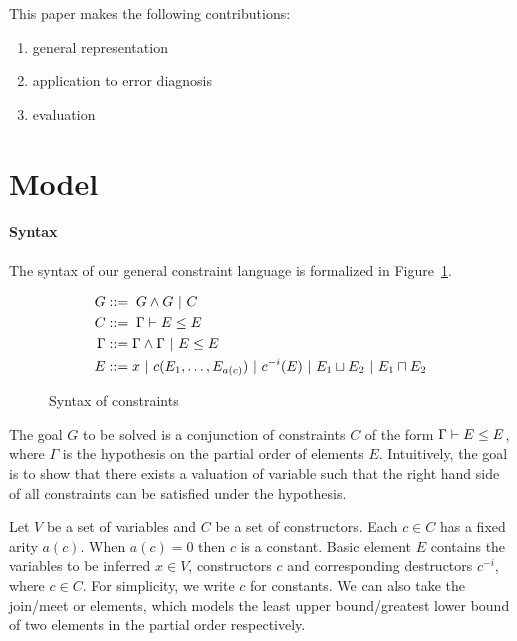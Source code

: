 
This paper makes the following contributions:

\begin{enumerate}
\item
general representation

\item
application to error diagnosis

\item
evaluation
\end{enumerate}

\section{Model}
\label{sec:model}

\paragraph{Syntax}

The syntax of our general constraint language is formalized in
Figure~\ref{figure:lang:syntax}.

\begin{figure}
\begin{align*}
G &::=\; G \land G\ |\ C \\
C &::=\; \Gamma \vdash E \leq E\\
\Gamma &::= \Gamma \land \Gamma\ |\ E \leq E \\
E &::= x\ |\ c(E_1,\dots,E_{a(c)})\ |\ c^{-i}(E)\ |\ E_1 \sqcup E_2 \
|\ E_1 \sqcap E_2
\end{align*}
\caption{Syntax of constraints}
\label{figure:lang:syntax}
\end{figure}

The goal $G$ to be solved is a conjunction of constraints $C$ of the form
$\Gamma \vdash E \leq E$, where $\Gamma$ is the hypothesis on the partial
order of elements $E$. Intuitively, the goal is to show that there exists a
valuation of variable such that the right hand side of all constraints can be
satisfied under the hypothesis.

Let $V$ be a set of variables and $C$ be a set of constructors. Each $c\in C$
has a fixed arity $a(c)$. When $a(c)=0$ then $c$ is a constant. Basic element
$E$ contains the variables to be inferred $x\in V$, constructors $c$ and
corresponding destructors $c^{-i}$, where $c\in C$. For simplicity, we write
$c$ for constants. We can also take the join/meet or elements, which models the
least upper bound/greatest lower bound of two elements in the partial order
respectively.

